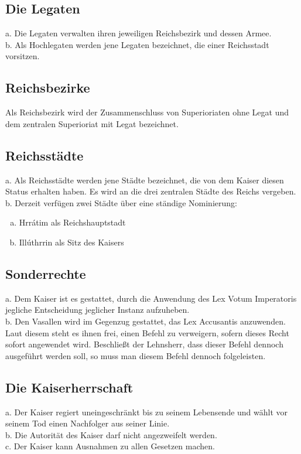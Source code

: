 \documentclass{article}
\begin{document}
\subsection{Die Legaten}
a. Die Legaten verwalten ihren jeweiligen Reichsbezirk und dessen Armee.  \\
b. Als Hochlegaten werden jene Legaten bezeichnet, die einer Reichsstadt vorsitzen. 

\subsection{Reichsbezirke}
Als Reichsbezirk wird der Zusammenschluss von Superioriaten ohne Legat und dem zentralen Superioriat mit Legat bezeichnet.  

\subsection{Reichsstädte}
a. Als Reichsstädte werden jene Städte bezeichnet, die von dem Kaiser diesen Status erhalten haben. Es wird an die drei zentralen Städte des Reichs vergeben.  \\
b. Derzeit verfügen zwei Städte über eine ständige Nominierung:  
\begin{enumerate}[a)]
\item Hrrátim als Reichshauptstadt  
\item Illúthrrin als Sitz des Kaisers  
\end{enumerate}

\subsection{Sonderrechte}
a. Dem Kaiser ist es gestattet, durch die Anwendung des Lex Votum Imperatoris jegliche Entscheidung jeglicher Instanz aufzuheben.  \\
b. Den Vasallen wird im Gegenzug gestattet, das Lex Accusantis anzuwenden. Laut diesem steht es ihnen frei, einen Befehl zu verweigern, sofern dieses Recht sofort angewendet wird. Beschließt der Lehnsherr, dass dieser Befehl dennoch ausgeführt werden soll, so muss man diesem Befehl dennoch folgeleisten. 

\subsection{Die Kaiserherrschaft}
a. Der Kaiser regiert uneingeschränkt bis zu seinem Lebensende und wählt vor seinem Tod einen Nachfolger aus seiner Linie.  \\
b. Die Autorität des Kaiser darf nicht angezweifelt werden.  \\
c. Der Kaiser kann Ausnahmen zu allen Gesetzen machen.  \\
\end{document}
